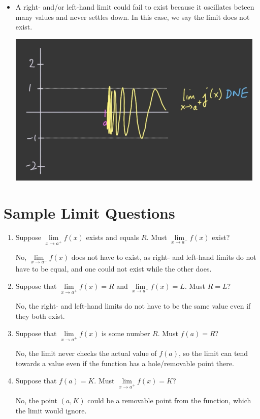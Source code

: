 \documentclass{article}
\begin{document}
\begin{itemize}
    \item A right- and/or left-hand limit could fail to exist because it oscillates beteen many values
    and never settles down. In this case, we say the limit does not exist.
    \begin{center}\includegraphics[scale = 0.5]{Images/PossibleBehavior4.png}\end{center}
\end{itemize}

\section{Sample Limit Questions}
\begin{enumerate}
\item Suppose $\underset{x \rightarrow a^{+}}{\lim} f(x)$ exists and equals $R$. Must
    $\underset{x \rightarrow a^{-}}{\lim} f(x)$ exist?

No, $\underset{x \rightarrow a^{-}}{\lim} f(x)$ does not have to exist, as right- and left-hand limits
do not have to be equal, and one could not exist while the other does.

\item Suppose that $\underset{x \rightarrow a^{+}}{\lim} f(x) = R$ and
    $\underset{x \rightarrow a^{-}}{\lim} f(x) = L$. Must $R = L$?

No, the right- and left-hand limits do not have to be the same value even if they both exist.

\item Suppose that $\underset{x \rightarrow a^{+}}{\lim} f(x)$ is some number $R$. Must $f(a) = R$?

No, the limit never checks the actual value of $f(a)$, so the limit can tend towards a value
even if the function has a hole/removable point there.

\item Suppose that $f(a) = K$. Must $\underset{x \rightarrow a^{+}}{\lim} f(x) = K$?

No, the point $(a, K)$ could be a removable point from the function, which the limit would ignore.
\end{enumerate}
\end{document}
